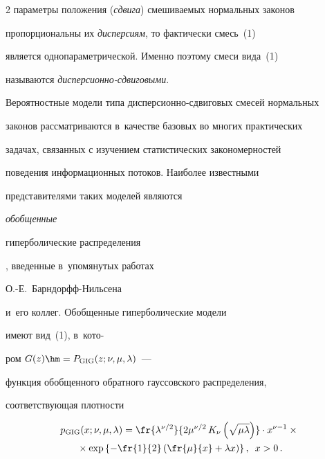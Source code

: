 \begin{multicols}{2}
параметры положения ({\it сдвига}) смешиваемых нормальных законов


пропорциональны их {\it дисперсиям}, то фактически смесь~(1)


является однопараметрической. Именно поэтому смеси вида~(1)


называются {\it дис\-пер\-си\-он\-но-сдви\-го\-выми}.





Вероятностные модели типа дис\-пер\-си\-он\-но-сдви\-го\-вых смесей нормальных


законов рассматриваются в~качестве базовых во многих практических


задачах, связанных с изучением статистических закономерностей


поведения информационных потоков. Наиболее известными


представителями таких моделей являются {\it обобщенные


гиперболические распределения}, введенные в~упомянутых работах 


\mbox{О.-Е.}~Барн\-дорфф-Ниль\-се\-на 


и~его коллег. Обобщенные гиперболические модели


имеют вид~(1), в~кото-\linebreak\vspace*{-12pt}





\pagebreak





\noindent


ром $G(z)\hm=P_{\mathrm{GIG}}(z;\nu,\mu,\lambda)$~---


функция обобщенного обратного гауссовского распределения,


соответствующая плотности


\begin{multline*}


p_{\mathrm{GIG}}(x;\nu,\mu,\lambda)=\fr{\lambda^{\nu/2}}{2\mu^{\nu/2}\,


K_{\nu}\left(\sqrt{\mu\lambda}\right)}\cdot


x^{\nu-1}\times{}\\


{}\times\exp\left\{-\fr{1}{2}\left(\fr{\mu}{x}+\lambda


x\right)\right\},\enskip x>0\,.


\end{multline*}



\end{multicols}
